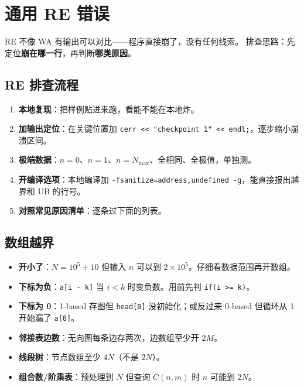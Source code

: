 \documentclass[UTF8,openany,oneside,zihao=-4]{ctexbook}
\begin{document}
\chapter{通用 RE 错误}

\begin{note}
RE 不像 WA 有输出可以对比——程序直接崩了，没有任何线索。
排查思路：先定位\textbf{崩在哪一行}，再判断\textbf{哪类原因}。
\end{note}

\section{RE 排查流程}

\begin{enumerate}
  \item \textbf{本地复现}：把样例贴进来跑，看能不能在本地炸。
  \item \textbf{加输出定位}：在关键位置加 \lstinline|cerr << "checkpoint 1" << endl;|，逐步缩小崩溃区间。
  \item \textbf{极端数据}：$n=0$、$n=1$、$n=N_{\max}$、全相同、全极值，单独测。
  \item \textbf{开编译选项}：本地编译加 \lstinline|-fsanitize=address,undefined -g|，能直接报出越界和 UB 的行号。
  \item \textbf{对照常见原因清单}：逐条过下面的列表。
\end{enumerate}

\section{数组越界}

\begin{warn}
\begin{itemize}
  \item \textbf{开小了}：$N = 10^5 + 10$ 但输入 $n$ 可以到 $2 \times 10^5$。仔细看数据范围再开数组。
  \item \textbf{下标为负}：\lstinline|a[i - k]| 当 $i < k$ 时变负数。用前先判 \lstinline|if(i >= k)|。
  \item \textbf{下标为 0}：1-based 存图但 \lstinline|head[0]| 没初始化；或反过来 0-based 但循环从 1 开始漏了 \lstinline|a[0]|。
  \item \textbf{邻接表边数}：无向图每条边存两次，边数组至少开 $2M$。
  \item \textbf{线段树}：节点数组至少 $4N$（不是 $2N$）。
  \item \textbf{组合数/阶乘表}：预处理到 $N$ 但查询 $C(n, m)$ 时 $n$ 可能到 $2N$。
\end{itemize}
\end{warn}
\end{document}

